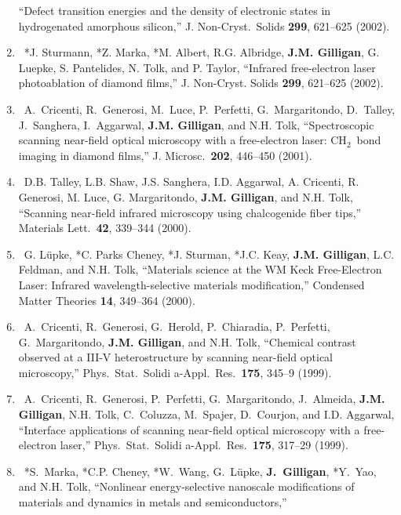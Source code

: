 \begin{enumerate}
    \enquote{Defect transition energies and the density of electronic states in hydrogenated amorphous silicon,} 
    J. Non-Cryst.\ Solids \textbf{299}, 621--625 (2002).
%
    \item
    \textdagger\ 
    *J. Sturmann, *Z. Marka, *M. Albert, R.G. Albridge, \textbf{J.M. Gilligan}, G. Luepke, S. Pantelides, N. Tolk, and P. Taylor,
    \enquote{Infrared free-electron laser photoablation of diamond films,}
    J. Non-Cryst. Solids \textbf{299}, 621--625 (2002).
%
    \item
    \textdagger\ 
    A.~Cricenti, R.~Generosi, M.~Luce, P.~Perfetti, G.~Margaritondo, D.~Talley, J.~Sanghera, I.~Aggarwal, \textbf{J.M. Gilligan}, and N.H. Tolk, 
    \enquote{Spectroscopic scanning near-field optical microscopy with a free-electron laser: {CH$_2$}~bond imaging in diamond films,}  
    J. Microsc.\ \textbf{202}, 446--450 (2001). 
%
    \item
    \textdagger\ 
    D.B. Talley, L.B. Shaw, J.S. Sanghera, I.D. Aggarwal, A. Cricenti, R. Generosi, M. Luce, G. Margaritondo, \textbf{J.M. Gilligan}, and N.H. Tolk, 
    \enquote{Scanning near-field infrared microscopy using chalcogenide fiber tips,} 
    Materials Lett.\ \textbf{42}, 339--344 (2000).
%	
    \item
    \textdagger\ 
    G. L\"upke, *C. Parks Cheney, *J. Sturman, *J.C. Keay, \textbf{J.M. Gilligan}, L.C. Feldman, and N.H. Tolk, 
    \enquote{Materials science at the WM Keck Free-Electron Laser: Infrared wavelength-selective materials modification,} 
    Condensed Matter Theories \textbf{14}, 349--364 (2000).
%	
    \item
    \textdagger\ 
    A.~Cricenti, R.~Generosi, G.~Herold, P.~Chiaradia, P.~Perfetti, G.~Margaritondo, \textbf{J.M. Gilligan}, and N.H. Tolk,
    \enquote{Chemical contrast observed at a {III-V} heterostructure by scanning near-field optical microscopy,}  
    Phys.\ Stat.\ Solidi a-Appl.\ Res.\ \textbf{175}, 345--9 (1999). 
%	
    \item
    \textdagger\ 
    A.~Cricenti, R.~Generosi, P.~Perfetti, G.~Margaritondo, J.~Almeida, \textbf{J.M. Gilligan},  N.H. Tolk, C.~Coluzza, M.~Spajer, D.~Courjon, and I.D. Aggarwal, 
    \enquote{Interface applications of scanning near-field optical microscopy with a free-electron laser,}  
    Phys.\ Stat.\ Solidi a-Appl.\ Res.\ \textbf{175}, 317--29 (1999). 
%	
    \item
    \textdagger\ 
    *S.~Marka, *C.P. Cheney, *W.~Wang, G.~L\"upke, \textbf{J.~Gilligan}, *Y.~Yao, and N.H. Tolk, 
    \enquote{Nonlinear energy-selective nanoscale modifications of materials and dynamics in metals and semiconductors,}  

\end{enumerate}
